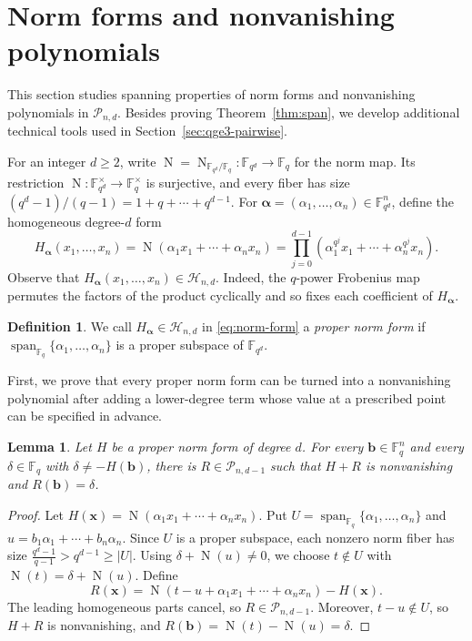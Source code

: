 \documentclass[12pt,reqno]{amsart}
\newtheorem{lem}[thm]{Lemma}
\theoremstyle{definition}
\newtheorem{defn}[thm]{Definition}
\newcommand{\Nm}{\operatorname{N}}
\newcommand{\F}{\mathbb{F}}
\newcommand{\cH}{\mathcal H}
\newcommand{\cP}{\mathcal P}
\newcommand{\Span}{\operatorname{span}}
\begin{document}
\section{Norm forms and nonvanishing polynomials}\label{sec:span}

This section studies spanning properties of norm forms and nonvanishing polynomials in $\cP_{n,d}$. Besides proving Theorem~\ref{thm:span}, we develop additional technical tools used in Section~\ref{sec:qge3-pairwise}.

For an integer $d\geq 2$, write $\Nm=\Nm_{\F_{q^d}/\F_q}\colon \F_{q^d}\to \F_q$ for the norm map. Its restriction $\Nm\colon \F_{q^d}^\times\to\F_q^\times$ is
surjective, and every fiber has size $(q^d-1)/(q-1)=1+q+\cdots+q^{d-1}$. For
$\boldsymbol{\alpha}=(\alpha_1,\ldots,\alpha_n)\in \F_{q^d}^n$, define the homogeneous degree-$d$ form
\begin{equation}\label{eq:norm-form}
  H_{\boldsymbol{\alpha}}(x_1,\ldots,x_n)
  =\Nm(\alpha_1x_1+\cdots+\alpha_nx_n)
  =\prod_{j=0}^{d-1}
     (\alpha_1^{q^j}x_1+\cdots+\alpha_n^{q^j}x_n).
\end{equation}
Observe that  $H_{\boldsymbol{\alpha}}(x_1,\ldots,x_n)\in\cH_{n,d}$. Indeed, the $q$-power Frobenius map permutes the factors of the product cyclically and so fixes each coefficient of $H_{\boldsymbol{\alpha}}$.

\begin{defn}
We call $H_{\boldsymbol{\alpha}}\in \cH_{n,d}$ in \eqref{eq:norm-form} a \emph{proper norm form} if $\Span_{\F_q}\{\alpha_1,\ldots,\alpha_n\}$ is a proper subspace of $\F_{q^d}$.
\end{defn}

First, we prove that every proper norm form can be turned into a nonvanishing polynomial after adding a lower-degree term whose value at a prescribed point can be specified in advance.

\begin{lem} \label{lem:nonvanishing-completion}
Let $H$ be a proper norm form of degree $d$. For every $\mathbf b\in\F_q^n$ and every $\delta\in\F_q$ with $\delta\neq-H(\mathbf b)$, there is $R\in\cP_{n,d-1}$ such that $H+R$ is nonvanishing and $R(\mathbf b)=\delta$.
\end{lem}

\begin{proof}
Let $H(\mathbf{x})=\Nm(\alpha_1x_1+\cdots+\alpha_nx_n)$. Put $U=\Span_{\F_q}\{\alpha_1,\ldots,\alpha_n\}$ and $u= b_1\alpha_1+\cdots+b_n\alpha_n$. Since $U$ is a proper subspace, each nonzero norm fiber has size $\frac{q^{d}-1}{q-1}>q^{d-1}\geq |U|$. Using $\delta+\Nm(u)\neq 0$, we choose $t\notin U$ with
$\Nm(t)=\delta+\Nm(u)$. Define
\[
  R(\mathbf x)
  =\Nm\!\left(t-u+\alpha_1x_1+\cdots+\alpha_nx_n\right)
   -H(\mathbf x).
\]
The leading homogeneous parts cancel, so $R\in\cP_{n,d-1}$. Moreover, $t-u\notin U$, so $H+R$ is nonvanishing, and $R(\mathbf b)=\Nm(t)-\Nm(u)=\delta$.
\end{proof}
\end{document}
